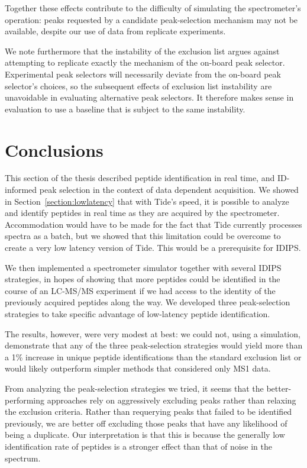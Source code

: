 \documentclass[12pt,twoside,openright]{report}
\begin{document}
Together these effects contribute to the difficulty of simulating the
spectrometer's operation: peaks requested by a candidate peak-selection
mechanism may not be available, despite our use of data from replicate
experiments.

We note furthermore that the instability of the exclusion list argues against
attempting to replicate exactly the mechanism of the on-board peak selector.
Experimental peak selectors will necessarily deviate from the on-board peak
selector's choices, so the subsequent effects of exclusion list instability are
unavoidable in evaluating alternative peak selectors. It therefore makes sense
in evaluation to use a baseline that is subject to the same instability.

\section{Conclusions}

This section of the thesis described peptide identification in real time, and
ID-informed peak selection in the context of data dependent acquisition.  We
showed in Section~\ref{section:lowlatency} that with Tide's speed, it is
possible to analyze and identify peptides in real time as they are acquired by
the spectrometer. Accommodation would have to be made for the fact that Tide
currently processes spectra as a batch, but we showed that this limitation could
be overcome to create a very low latency version of Tide. This would be a
prerequisite for IDIPS.

We then implemented a spectrometer simulator together with several IDIPS
strategies, in hopes of showing that more peptides could be identified in the
course of an LC-MS/MS experiment if we had access to the identity of the
previously acquired peptides along the way. We developed three peak-selection
strategies to take specific advantage of low-latency peptide identification.

The results, however, were very modest at best: we could not, using a
simulation, demonstrate that any of the three peak-selection strategies would
yield more than a 1\% increase in unique peptide identifications than the
standard exclusion list or would likely outperform simpler methods that
considered only MS1 data.

From analyzing the peak-selection strategies we tried, it seems that the
better-performing approaches rely on aggressively excluding peaks rather than
relaxing the exclusion criteria. Rather than requerying peaks that failed to be
identified previously, we are better off excluding those peaks that have any
likelihood of being a duplicate. Our interpretation is that this is because the
generally low identification rate of peptides is a stronger effect than that of
noise in the spectrum.
\end{document}
